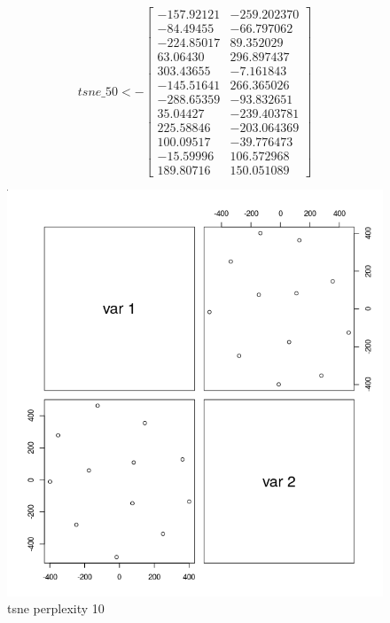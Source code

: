 \documentclass{report}
\begin{document}
\[
  tsne\_50 <- 
  \begin{bmatrix}
    -157.92121 & -259.202370 \\
    -84.49455 & -66.797062 \\
    -224.85017 & 89.352029 \\
    63.06430 & 296.897437 \\
    303.43655 & -7.161843 \\
    -145.51641 & 266.365026 \\
    -288.65359 & -93.832651 \\
    35.04427 & -239.403781 \\
    225.58846 & -203.064369 \\
    100.09517 & -39.776473 \\
    -15.59996 & 106.572968 \\
    189.80716 & 150.051089
  \end{bmatrix}
\]

\begin{figure}[H]
  \includegraphics[width=\linewidth]{tsne_p_10.png}
  \caption{tsne perplexity 10}
  \label{fig:tsnep10}
\end{figure}
\end{document}
